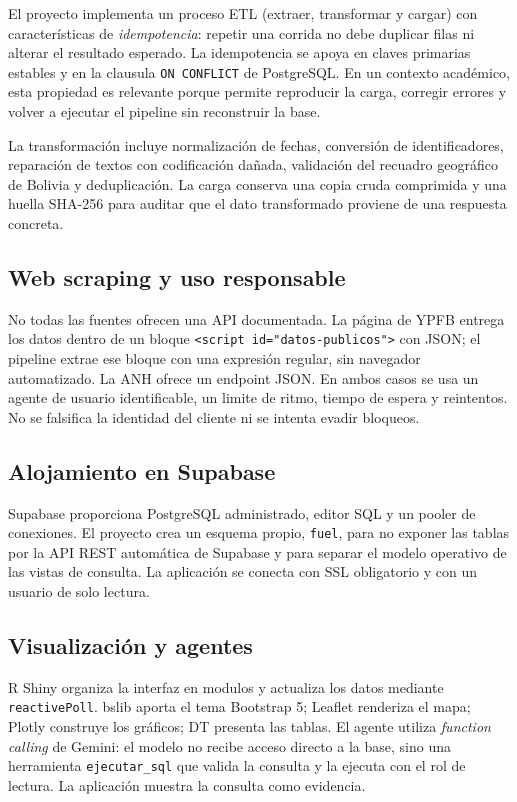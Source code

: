 \documentclass[12pt,a4paper]{article}
\newcommand{\fuel}{\texttt{fuel}}
\begin{document}
El proyecto implementa un proceso ETL (extraer, transformar y cargar) con características de \emph{idempotencia}: repetir una corrida no debe duplicar filas ni alterar el resultado esperado. La idempotencia se apoya en claves primarias estables y en la clausula \texttt{ON CONFLICT} de PostgreSQL. En un contexto académico, esta propiedad es relevante porque permite reproducir la carga, corregir errores y volver a ejecutar el pipeline sin reconstruir la base.

La transformación incluye normalización de fechas, conversión de identificadores, reparación de textos con codificación dañada, validación del recuadro geográfico de Bolivia y deduplicación. La carga conserva una copia cruda comprimida y una huella SHA-256 para auditar que el dato transformado proviene de una respuesta concreta.

\subsection{Web scraping y uso responsable}

No todas las fuentes ofrecen una API documentada. La página de YPFB entrega los datos dentro de un bloque \texttt{<script id="datos-publicos">} con JSON; el pipeline extrae ese bloque con una expresión regular, sin navegador automatizado. La ANH ofrece un endpoint JSON. En ambos casos se usa un agente de usuario identificable, un limite de ritmo, tiempo de espera y reintentos. No se falsifica la identidad del cliente ni se intenta evadir bloqueos.

\subsection{Alojamiento en Supabase}

Supabase proporciona PostgreSQL administrado, editor SQL y un pooler de conexiones. El proyecto crea un esquema propio, \fuel{}, para no exponer las tablas por la API REST automática de Supabase y para separar el modelo operativo de las vistas de consulta. La aplicación se conecta con SSL obligatorio y con un usuario de solo lectura.

\subsection{Visualización y agentes}

R Shiny organiza la interfaz en modulos y actualiza los datos mediante \texttt{reactivePoll}. bslib aporta el tema Bootstrap 5; Leaflet renderiza el mapa; Plotly construye los gráficos; DT presenta las tablas. El agente utiliza \emph{function calling} de Gemini: el modelo no recibe acceso directo a la base, sino una herramienta \texttt{ejecutar\_sql} que valida la consulta y la ejecuta con el rol de lectura. La aplicación muestra la consulta como evidencia.
\end{document}
